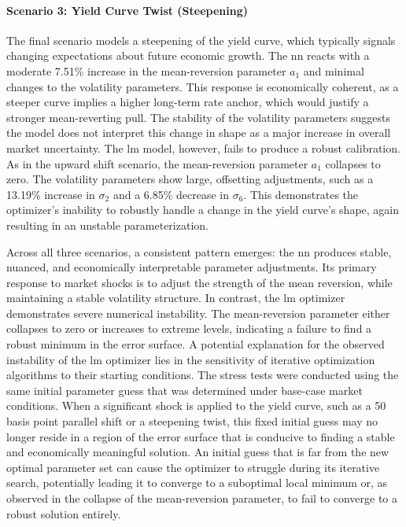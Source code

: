 \paragraph{Scenario 3: Yield Curve Twist (Steepening)}
The final scenario models a steepening of the yield curve, which typically signals changing expectations about future economic growth. The \ac{nn} reacts with a moderate 7.51\% increase in the mean-reversion parameter $a_1$ and minimal changes to the volatility parameters. This response is economically coherent, as a steeper curve implies a higher long-term rate anchor, which would justify a stronger mean-reverting pull. The stability of the volatility parameters suggests the model does not interpret this change in shape as a major increase in overall market uncertainty. The \ac{lm} model, however, fails to produce a robust calibration. As in the upward shift scenario, the mean-reversion parameter $a_1$ collapses to zero. The volatility parameters show large, offsetting adjustments, such as a 13.19\% increase in $\sigma_2$ and a 6.85\% decrease in $\sigma_6$. This demonstrates the optimizer's inability to robustly handle a change in the yield curve's shape, again resulting in an unstable parameterization.

Across all three scenarios, a consistent pattern emerges: the \ac{nn} produces stable, nuanced, and economically interpretable parameter adjustments. Its primary response to market shocks is to adjust the strength of the mean reversion, while maintaining a stable volatility structure. In contrast, the \ac{lm} optimizer demonstrates severe numerical instability. The mean-reversion parameter either collapses to zero or increases to extreme levels, indicating a failure to find a robust minimum in the error surface. A potential explanation for the observed instability of the \ac{lm} optimizer lies in the sensitivity of iterative optimization algorithms to their starting conditions. The stress tests were conducted using the same initial parameter guess that was determined under base-case market conditions. When a significant shock is applied to the yield curve, such as a 50 basis point parallel shift or a steepening twist, this fixed initial guess may no longer reside in a region of the error surface that is conducive to finding a stable and economically meaningful solution. An initial guess that is far from the new optimal parameter set can cause the optimizer to struggle during its iterative search, potentially leading it to converge to a suboptimal local minimum or, as observed in the collapse of the mean-reversion parameter, to fail to converge to a robust solution entirely.

